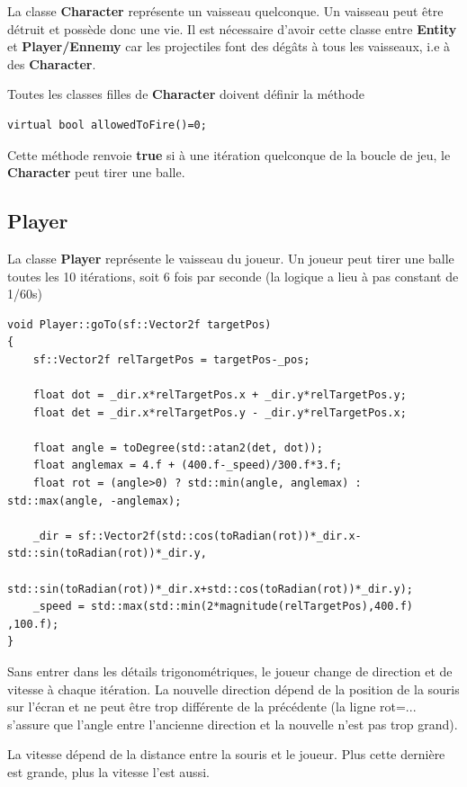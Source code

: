 \documentclass{article}
\begin{document}
La classe \textbf{Character} représente un vaisseau quelconque. Un vaisseau peut être détruit et possède donc une vie. Il est nécessaire d'avoir cette classe entre \textbf{Entity} et \textbf{Player/Ennemy} car les projectiles font des dégâts à tous les vaisseaux, i.e à des \textbf{Character}.

Toutes les classes filles de \textbf{Character} doivent définir la méthode

\begin{verbatim}
virtual bool allowedToFire()=0;
\end{verbatim}

Cette méthode renvoie \textbf{true} si à une itération quelconque de la boucle de jeu, le \textbf{Character} peut tirer une balle.

\subsection{Player}

La classe \textbf{Player} représente le vaisseau du joueur. Un joueur peut tirer une balle toutes les 10 itérations, soit 6 fois par seconde (la logique a lieu à pas constant de 1/60s)

\begin{verbatim}
void Player::goTo(sf::Vector2f targetPos)
{
    sf::Vector2f relTargetPos = targetPos-_pos;

    float dot = _dir.x*relTargetPos.x + _dir.y*relTargetPos.y;
    float det = _dir.x*relTargetPos.y - _dir.y*relTargetPos.x;

    float angle = toDegree(std::atan2(det, dot));
    float anglemax = 4.f + (400.f-_speed)/300.f*3.f;
    float rot = (angle>0) ? std::min(angle, anglemax) : std::max(angle, -anglemax); 

    _dir = sf::Vector2f(std::cos(toRadian(rot))*_dir.x-std::sin(toRadian(rot))*_dir.y, 
    	std::sin(toRadian(rot))*_dir.x+std::cos(toRadian(rot))*_dir.y);
    _speed = std::max(std::min(2*magnitude(relTargetPos),400.f) ,100.f);
}
\end{verbatim}

Sans entrer dans les détails trigonométriques, le joueur change de direction et de vitesse à chaque itération. La nouvelle direction dépend de la position de la souris sur l'écran et ne peut être trop différente de la précédente (la ligne rot=... s'assure que l'angle entre l'ancienne direction et la nouvelle n'est pas trop grand).

La vitesse dépend de la distance entre la souris et le joueur. Plus cette dernière est grande, plus la vitesse l'est aussi.
\end{document}
